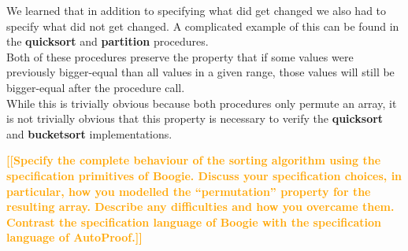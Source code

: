 \documentclass{report}
\newcommand{\todo}[1]{\textsf{\textbf{\textcolor{orange}{[[#1]]}}}}
\begin{document}
We learned that in addition to specifying what did get changed we also had to
specify what did not get changed. A complicated example of this can be found in
the \textbf{quicksort} and \textbf{partition} procedures.\\
Both of these procedures preserve the property that if some values were previously
bigger-equal than all values in a given range, those values will still be bigger-equal
after the procedure call.\\
While this is trivially obvious because both procedures only permute an array,
it is not trivially obvious that this property is necessary to verify the
\textbf{quicksort} and \textbf{bucketsort} implementations.

\todo{Specify the complete behaviour of the sorting algorithm
using the specification primitives of Boogie. Discuss your specification choices, in
particular, how you modelled the “permutation” property for the resulting array.
Describe any difficulties and how you overcame them. Contrast the specification
language of Boogie with the specification language of AutoProof.}
\end{document}
